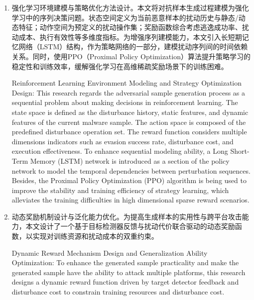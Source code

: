 \begin{enumerate} [label=\arabic*)]
Introducing Benign Sample Feature Disturbance Mechanism: Different from traditional methods using random noise or invalid padding bytes, this study innovatively introduces feature byte sequences that are extracted from real benign software samples as disturbance byte sources. This method enhances the "benign concealment effect" of adversarial samples and increases the misjudgment rate of malware detection systems. By constructing a benign byte repository and through encoding and filtering its semantic information, it prioritizes selecting benign fragments similar to the target sample to embed in the target sample during disturbance, which improves the interpretability and obfuscation capability of generated samples.
\item 强化学习环境建模与策略优化方法设计。本文将对抗样本生成过程建模为强化学习中的序列决策问题。状态空间定义为当前恶意样本的扰动历史与静态/动态特征；动作空间为预定义的扰动操作集；奖励函数综合考虑逃逸成功率、扰动成本、执行有效性等多维度指标。为增强序列建模能力，本文引入长短期记忆网络（LSTM）结构，作为策略网络的一部分，建模扰动序列间的时间依赖关系。同时，使用PPO（Proximal Policy Optimization）算法提升策略学习的稳定性和训练效率，缓解强化学习在高维稀疏奖励场景下的训练困难。

Reinforcement Learning Environment Modeling and Strategy Optimization Design: This research regards the adversarial sample generation process as a sequential problem about making decisions in reinforcement learning. The state space is defined as the disturbance history, static features, and dynamic features of the current malware sample. The action space is composed of the predefined disturbance operation set. The reward function considers multiple dimensions indicators such as evasion success rate, disturbance cost, and execution effectiveness. To enhance sequential modeling ability, a Long Short-Term Memory (LSTM) network is introduced as a section of the policy network to model the temporal dependencies between perturbation sequences. Besides, the Proximal Policy Optimization (PPO) algorithm is being used to improve the stability and training efficiency of strategy learning, which alleviates the training difficulties in high dimensional sparse reward scenarios.
\item 动态奖励机制设计与泛化能力优化。为提高生成样本的实用性与跨平台攻击能力，本文设计了一个基于目标检测器反馈与扰动代价联合驱动的动态奖励函数，以实现对训练资源和扰动成本的双重约束。		

Dynamic Reward Mechanism Design and Generalization Ability Optimization: To enhance the generated sample practicality and make the generated sample have the ability to attack multiple platforms, this research designs a dynamic reward function driven by target detector feedback and disturbance cost to constrain training resources and disturbance cost.
\end{enumerate}

